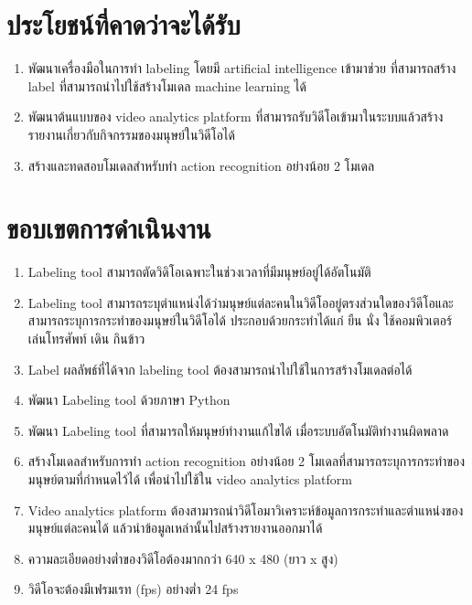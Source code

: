 \section{ประโยชน์ที่คาดว่าจะได้รับ}
\begin{enumerate}[label=\arabic*, leftmargin=1.5cm]
	\setlength\itemsep{-0.25em}
	\item พัฒนาเครื่องมือในการทำ labeling โดยมี artificial intelligence เข้ามาช่วย ที่สามารถสร้าง label ที่สามารถนำไปใช้สร้างโมเดล machine learning ได้
	\item พัฒนาต้นแบบของ video analytics platform ที่สามารถรับวิดีโอเข้ามาในระบบแล้วสร้างรายงานเกี่ยวกับกิจกรรมของมนุษย์ในวิดีโอได้
	\item สร้างและทดสอบโมเดลสำหรับทำ action recognition อย่างน้อย 2 โมเดล
\end{enumerate}
\clearpage

\section{ขอบเขตการดำเนินงาน}
\begin{enumerate}[label=\arabic*, leftmargin=1.5cm]
	\setlength\itemsep{-0.25em}
	\item Labeling tool สามารถตัดวิดิโอเฉพาะในช่วงเวลาที่มีมนุษย์อยู่ได้อัตโนมัติ
	\item Labeling tool สามารถระบุตำแหน่งได้ว่ามนุษย์แต่ละคนในวิดีโออยู่ตรงส่วนใดของวิดีโอและสามารถระบุการกระทำของมนุษย์ในวิดีโอได้ ประกอบด้วยกระทำได้แก่ ยืน นั่ง ใช้คอมพิวเตอร์ เล่นโทรศัพท์ เดิน กินข้าว 
	\item Label ผลลัพธ์ที่ได้จาก labeling tool ต้องสามารถนำไปใช้ในการสร้างโมเดลต่อได้
	\item พัฒนา Labeling tool ด้วยภาษา Python
	\item พัฒนา Labeling tool ที่สามารถให้มนุษย์ทำงานแก้ไขได้ เมื่อระบบอัตโนมัติทำงานผิดพลาด
	\item สร้างโมเดลสำหรับการทำ action recognition อย่างน้อย 2 โมเดลที่สามารถระบุการกระทำของมนุษย์ตามที่กำหนดไว้ได้ เพื่อนำไปใช้ใน video analytics platform
	\item Video analytics platform ต้องสามารถนำวิดีโอมาวิเคราะห์ข้อมูลการกระทำและตำแหน่งของมนุษย์แต่ละคนได้ แล้วนำข้อมูลเหล่านั้นไปสร้างรายงานออกมาได้
	\item ความละเอียดอย่างต่ำของวิดีโอต้องมากกว่า 640 x 480 (ยาว x สูง)
	\item วิดีโอจะต้องมีเฟรมเรท (fps) อย่างต่ำ 24 fps
\end{enumerate}

